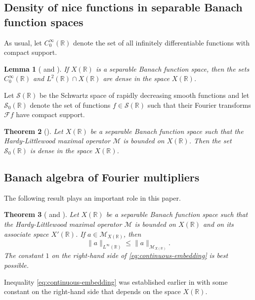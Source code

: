 \documentclass{birkjour}
\newtheorem{theorem}{Theorem}[section]
\newtheorem{lemma}[theorem]{Lemma}
\numberwithin{equation}{section}
\newcommand{\R}{\mathbb{R}}
\newcommand{\cF}{\mathcal{F}}
\newcommand{\cM}{\mathcal{M}}
\newcommand{\cS}{\mathcal{S}}
\begin{document}
\subsection{Density of nice functions in separable Banach function spaces}
As usual, let $C_0^\infty(\R)$ denote the set of all infinitely
differentiable functions with compact support.
\begin{lemma}[{\cite[Lemma~2.1]{FKK-AFA} and \cite[Lemma~2.12(a)]{KS14}}]
\label{le:density-Cc-infty}
If $X(\R)$ is a separable Banach function space, then the sets $C_0^\infty(\R)$
and $L^2(\R)\cap X(\R)$ are dense in the space $X(\R)$.
\end{lemma}
Let $\cS(\R)$ be the Schwartz space of rapidly decreasing smooth functions
and let $\cS_0(\R)$ denote the set of functions $f\in\cS(\R)$ such that
their Fourier transforms $\cF f$ have compact support.
\begin{theorem}[{\cite[Theorem~4]{FKK-ISAAC19}}]
\label{th:density-S0}
Let $X(\R)$ be a separable Banach function space such that the Hardy-Littlewood
maximal operator $\cM$ is bounded on $X(\R)$. Then the set $\cS_0(\R)$ is dense
in the space $X(\R)$.
\end{theorem}
\subsection{Banach algebra \boldmath{$\cM_{X(\R)}$} of Fourier multipliers}
The following result plays an important role in this paper.
\begin{theorem}[{\cite[Corollary~4.2]{KS19} and \cite[Theorem~2.4]{FKK-AFA}}]
\label{th:continuous-embedding}
Let $X(\R)$ be a separable Banach function space such that the
Hardy-Littlewood maximal operator $\cM$ is bounded on $X(\R)$ and on its
associate space $X'(\R)$. If $a\in\cM_{X(\R)}$, then
\begin{equation}\label{eq:continuous-embedding}
\|a\|_{L^\infty(\R)}\le\|a\|_{\cM_{X(\R)}}.
\end{equation}
The constant $1$ on the right-hand side of \eqref{eq:continuous-embedding}
is best possible.
\end{theorem}
Inequality \eqref{eq:continuous-embedding} was established earlier in
\cite[Theorem~1]{K15b} with some constant on the right-hand side
that depends on the space $X(\R)$.
\end{document}
